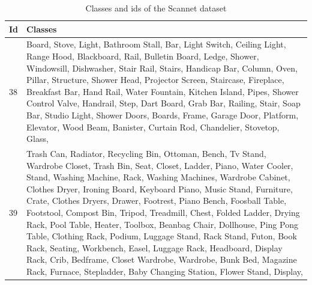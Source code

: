     \begin{table}
    	\begin{center}
    		\begin{tabular}{ | l | p{14cm} |}
    			\hline
    			
    			\cellcolor{purple!30}Id & \cellcolor{purple!30}Classes \\ \hline
    			38 & Board, Stove, Light, Bathroom Stall, Bar, Light Switch, Ceiling Light, Range Hood, Blackboard, Rail, Bulletin Board, Ledge, Shower, Windowsill, Dishwasher, Stair Rail, Stairs, Handicap Bar, Column, Oven, Pillar, Structure, Shower Head, Projector Screen, Staircase, Fireplace, Breakfast Bar, Hand Rail, Water Fountain, Kitchen Island, Pipes, Shower Control Valve, Handrail, Step, Dart Board, Grab Bar, Railing, Stair, Soap Bar, Studio Light, Shower Doors, Boards, Frame, Garage Door, Platform, Elevator, Wood Beam, Banister, Curtain Rod, Chandelier, Stovetop, Glass, \\ \hline
    			39 & Trash Can, Radiator, Recycling Bin, Ottoman, Bench, Tv Stand, Wardrobe Closet, Trash Bin, Seat, Closet, Ladder, Piano, Water Cooler, Stand, Washing Machine, Rack, Washing Machines, Wardrobe Cabinet, Clothes Dryer, Ironing Board, Keyboard Piano, Music Stand, Furniture, Crate, Clothes Dryers, Drawer, Footrest, Piano Bench, Foosball Table, Footstool, Compost Bin, Tripod, Treadmill, Chest, Folded Ladder, Drying Rack, Pool Table, Heater, Toolbox, Beanbag Chair, Dollhouse, Ping Pong Table, Clothing Rack, Podium, Luggage Stand, Rack Stand, Futon, Book Rack, Seating, Workbench, Easel, Luggage Rack, Headboard, Display Rack, Crib, Bedframe, Closet Wardrobe, Wardrobe, Bunk Bed, Magazine Rack, Furnace, Stepladder, Baby Changing Station, Flower Stand, Display, \\ \hline
    			\hline
    		\end{tabular}
    		\caption{Classes and ids of the Scannet dataset}
    		\label{table:Classes in scannet_2}
    	\end{center}
    \end{table}
    
